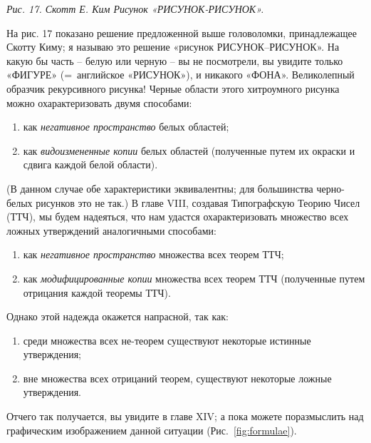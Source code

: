 \documentclass[../main.tex]{subfiles}
\begin{document}
\emph{Рис. 17. Скотт Е. Ким Рисунок «РИСУНОК-РИСУНОК».}

На рис. 17 показано решение предложенной выше головоломки, принадлежащее Скотту Киму; я называю это решение «рисунок РИСУНОК--РИСУНОК». На какую бы часть \--- белую или черную \--- вы не посмотрели, вы увидите только «ФИГУРЕ» (=~английское «РИСУНОК»), и никакого «ФОНА». Великолепный образчик рекурсивного рисунка! Черные области этого хитроумного рисунка можно охарактеризовать двумя способами:
%
\begin{enumerate}[label=(\arabic*), noitemsep, topsep=6pt, left=\parindent]
    \item как \emph{негативное пространство} белых областей;
    \item как \emph{видоизмененные копии} белых областей (полученные путем их окраски и сдвига каждой белой области).
\end{enumerate}
%
(В данном случае обе характеристики эквивалентны; для большинства черно-белых рисунков это не так.)
В главе VIII, создавая Типографскую Теорию Чисел (ТТЧ), мы будем надеяться, что нам удастся охарактеризовать множество всех ложных утверждений аналогичными способами:
%
\begin{enumerate}[label=(\arabic*), noitemsep, topsep=6pt, left=\parindent]
    \item как \emph{негативное пространство} множества всех теорем ТТЧ;
    \item как \emph{модифицированные копии} множества всех теорем ТТЧ (полученные путем отрицания каждой теоремы ТТЧ).
\end{enumerate}
%
Однако этой надежда окажется напрасной, так как:
%
\begin{enumerate}[label=(\arabic*), noitemsep, topsep=6pt, left=\parindent]
    \item среди множества всех не-теорем существуют некоторые истинные утверждения;
    \item вне множества всех отрицаний теорем, существуют некоторые ложные утверждения.
\end{enumerate}

Отчего так получается, вы увидите в главе XIV; а пока можете поразмыслить над графическим изображением данной ситуации (Рис.~\ref{fig:formulae}).
\end{document}

